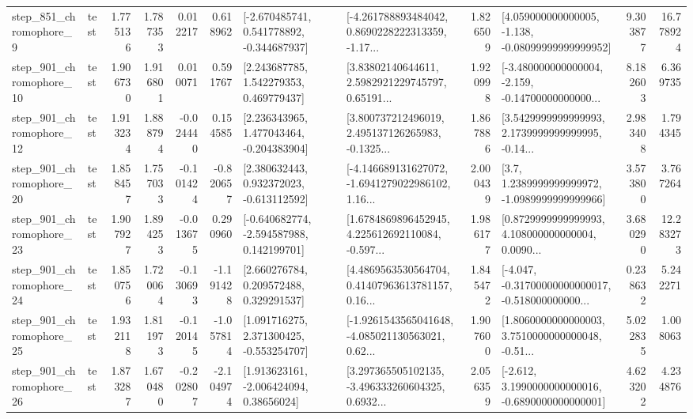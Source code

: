 \begin{tabular}{llrrrrllrlrr}
   step\_851\_chromophore\_9 &      test &      1.775136 &    1.787353 &      0.012217 &  0.618962 &   [-2.670485741, 0.541778892, -0.344687937] &  [-4.261788893484042, 0.8690228222313359, -1.17... &       1.826509 &  [4.059000000000005, -1.138, -0.08099999999999952] &            9.303877 &         16.778924 \\
  step\_901\_chromophore\_10 &      test &      1.906730 &    1.916801 &      0.010071 &  0.591767 &     [2.243687785, 1.542279353, 0.469779437] &  [3.83802140644611, 2.5982921229745797, 0.65191... &       1.920998 &  [-3.480000000000004, -2.159, -0.14700000000000... &            8.182603 &          6.369735 \\
  step\_901\_chromophore\_12 &      test &      1.913234 &    1.888794 &     -0.024440 &  0.154585 &    [2.236343965, 1.477043464, -0.204383904] &  [3.800737212496019, 2.495137126265983, -0.1325... &       1.867886 &  [3.5429999999999993, 2.1739999999999995, -0.14... &            2.983408 &          1.794345 \\
  step\_901\_chromophore\_20 &      test &      1.858457 &    1.757033 &     -0.101424 & -0.820657 &    [2.380632443, 0.932372023, -0.613112592] &  [-4.146689131627072, -1.6941279022986102, 1.16... &       2.000439 &     [3.7, 1.2389999999999972, -1.0989999999999966] &            3.573800 &          3.767264 \\
  step\_901\_chromophore\_23 &      test &      1.907927 &    1.894253 &     -0.013675 &  0.290960 &   [-0.640682774, -2.594587988, 0.142199701] &  [1.6784869896452945, 4.225612692110084, -0.597... &       1.986177 &  [0.8729999999999993, 4.108000000000004, 0.0090... &            3.680290 &         12.283273 \\
  step\_901\_chromophore\_24 &      test &      1.850756 &    1.720064 &     -0.130693 & -1.191428 &     [2.660276784, 0.209572488, 0.329291537] &  [4.4869563530564704, 0.41407963613781157, 0.16... &       1.845472 &  [-4.047, -0.31700000000000017, -0.518000000000... &            0.238632 &          5.242271 \\
  step\_901\_chromophore\_25 &      test &      1.932118 &    1.811973 &     -0.120145 & -1.057814 &    [1.091716275, 2.371300425, -0.553254707] &  [-1.9261543565041648, -4.085021130563021, 0.62... &       1.907600 &  [1.8060000000000003, 3.7510000000000048, -0.51... &            5.022835 &          1.008063 \\
  step\_901\_chromophore\_26 &      test &      1.873287 &    1.670480 &     -0.202807 & -2.104974 &     [1.913623161, -2.006424094, 0.38656024] &  [3.297365505102135, -3.496333260604325, 0.6932... &       2.056359 &  [-2.612, 3.1990000000000016, -0.6890000000000001] &            4.623202 &          4.234876 \\

\end{tabular}
